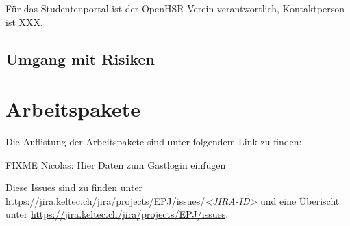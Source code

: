 \documentclass[a4paper]{article}
\let\oldsection\section
\renewcommand\section{\clearpage\oldsection}
\def\jiraurl{https://jira.keltec.ch/jira}
\begin{document}
Für das Studentenportal ist der OpenHSR-Verein verantwortlich, Kontaktperson ist XXX.

\subsection{Umgang mit Risiken}

\section{Arbeitspakete}

Die Auflistung der Arbeitspakete sind unter folgendem Link zu finden:

FIXME Nicolas: Hier Daten zum Gastlogin einfügen

%
%
%
%

Diese Issues sind zu finden unter \jiraurl/projects/EPJ/issues/\emph{\textless JIRA-ID\textgreater} und eine Überischt unter \url{\jiraurl/projects/EPJ/issues}.
\end{document}
